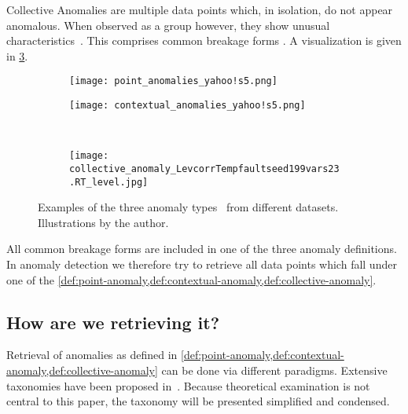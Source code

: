 \begin{definition}\label{def:collective-anomaly}
    Collective Anomalies are multiple data points which, in isolation, do not appear
    anomalous. When observed as a group however, they show unusual
    characteristics~\cite[cf.][]{Chandola.2009}. This comprises common breakage
    forms . A visualization is given in
    \cref{fig:collective-anomaly}.
\end{definition}

\begin{figure}[htp!]
    \begin{subfigure}[b]{.45\linewidth}
        \centering
        \texttt{[image: point\_anomalies\_yahoo!s5.png]}
        \label{fig:point-anomaly}
    \end{subfigure}%
    \hfill
    \begin{subfigure}[b]{.45\linewidth}
        \centering
        \texttt{[image: contextual\_anomalies\_yahoo!s5.png]}
        \label{fig:contextual-anomaly}
    \end{subfigure}\\[1ex]
    \begin{subfigure}[b]{\linewidth}
        \centering
        \texttt{[image: collective\_anomaly\_LevcorrTempfaultseed199vars23.RT\_level.jpg]}
        \label{fig:collective-anomaly}
    \end{subfigure}
    \caption[Examples of the three anomaly types]{Examples of the three anomaly types~\cite{Chandola.2009} from different datasets. Illustrations by the author.}\label{fig:anomaly-types}
\end{figure}

All common breakage forms are included in one of the three anomaly definitions.
In anomaly detection we therefore try to retrieve all data points which fall
under one of the \cref{def:point-anomaly,def:contextual-anomaly,def:collective-anomaly}.

\subsection{How are we retrieving it?}\label{subsect:how-are-we-retrieving-it}
Retrieval of anomalies as defined in \cref{def:point-anomaly,def:contextual-anomaly,def:collective-anomaly}
can be done via different paradigms. Extensive taxonomies have been proposed in~\cite{Chandola.2009,Zietlow.2020}.
Because theoretical examination is not central to this paper, the taxonomy will
be presented simplified and condensed.

